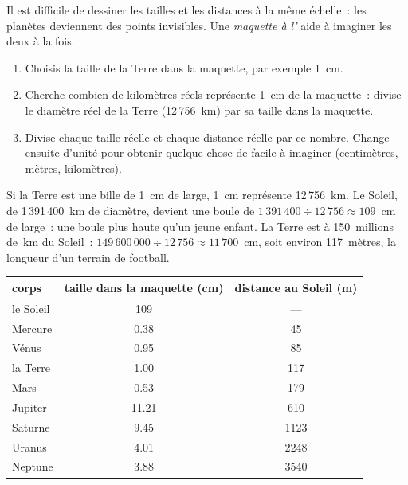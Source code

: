 Il est difficile de dessiner les tailles et les distances à la même
échelle~: les planètes deviennent des points invisibles. Une
\emph{maquette à l'} aide à imaginer les deux à la fois.

\begin{method}\label{met:g6:earth-a-planet:scale-model}
\begin{enumerate}
  \item Choisis la taille de la Terre dans la maquette, par exemple 1~cm.
  \item Cherche combien de kilomètres réels représente 1~cm de la
        maquette~: divise le diamètre réel de la Terre (12\,756~km) par sa
        taille dans la maquette.
  \item Divise chaque taille réelle et chaque distance réelle par ce
        nombre. Change ensuite d'unité pour obtenir quelque chose de facile
        à imaginer (centimètres, mètres, kilomètres).
\end{enumerate}
\end{method}

\begin{example}\label{ex:g6:earth-a-planet:marble}
Si la Terre est une bille de 1~cm de large, 1~cm représente 12\,756~km. Le
Soleil, de 1\,391\,400~km de diamètre, devient une boule de $1\,391\,400 \div 12\,756 \approx
109$~cm de large~: une boule plus haute
qu'un jeune enfant. La Terre est à 150~millions de~km du Soleil~:
$149\,600\,000 \div 12\,756 \approx 11\,700$~cm, soit environ 117~mètres,
la longueur d'un terrain de football.
\end{example}

\begin{center}\small
\begin{tabular}{|l|c|c|}
\hline
\textbf{corps} & \textbf{taille dans la maquette (cm)} & \textbf{distance au Soleil (m)} \\
\hline
le Soleil & 109 & --- \\
Mercure & 0.38 & 45 \\
Vénus & 0.95 & 85 \\
la Terre & 1.00 & 117 \\
Mars & 0.53 & 179 \\
Jupiter & 11.21 & 610 \\
Saturne & 9.45 & 1123 \\
Uranus & 4.01 & 2248 \\
Neptune & 3.88 & 3540 \\
\hline
\end{tabular}
\end{center}

